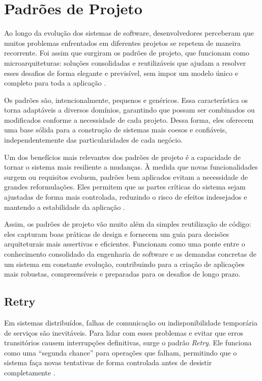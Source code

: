 \section{Padrões de Projeto}

Ao longo da evolução dos sistemas de software, desenvolvedores perceberam que muitos problemas enfrentados em diferentes projetos se repetem de maneira recorrente. Foi assim que surgiram os padrões de projeto, que funcionam como microarquiteturas: soluções consolidadas e reutilizáveis que ajudam a resolver esses desafios de forma elegante e previsível, sem impor um modelo único e completo para toda a aplicação \citep{Gamma1993}.

Os padrões são, intencionalmente, pequenos e genéricos. Essa característica os torna adaptáveis a diversos domínios, garantindo que possam ser combinados ou modificados conforme a necessidade de cada projeto. Dessa forma, eles oferecem uma base sólida para a construção de sistemas mais coesos e confiáveis, independentemente das particularidades de cada negócio.

Um dos benefícios mais relevantes dos padrões de projeto é a capacidade de tornar o sistema mais resiliente a mudanças. À medida que novas funcionalidades surgem ou requisitos evoluem, padrões bem aplicados evitam a necessidade de grandes reformulações. Eles permitem que as partes críticas do sistema sejam ajustadas de forma mais controlada, reduzindo o risco de efeitos indesejados e mantendo a estabilidade da aplicação \citep{Aversano2007}.

Assim, os padrões de projeto vão muito além da simples reutilização de código: eles capturam boas práticas de design e fornecem um guia para decisões arquiteturais mais assertivas e eficientes. Funcionam como uma ponte entre o conhecimento consolidado da engenharia de software e as demandas concretas de um sistema em constante evolução, contribuindo para a criação de aplicações mais robustas, compreensíveis e preparadas para os desafios de longo prazo.

\subsection{Retry}

Em sistemas distribuídos, falhas de comunicação ou indisponibilidade temporária de serviços são inevitáveis. Para lidar com esses problemas e evitar que erros transitórios causem interrupções definitivas, surge o padrão \textit{Retry}. Ele funciona como uma “segunda chance” para operações que falham, permitindo que o sistema faça novas tentativas de forma controlada antes de desistir completamente \citep{inproceedings}.

